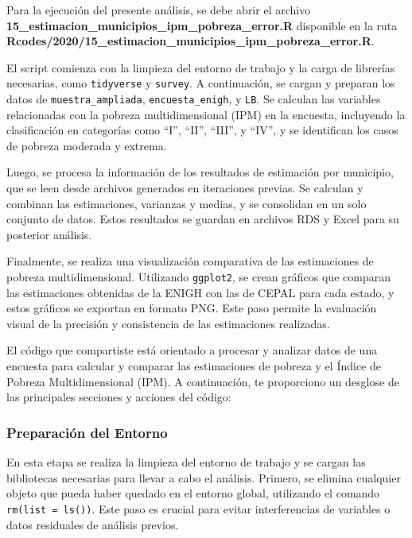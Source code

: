 \documentclass[
  12pt,
]{book}
\begin{document}
Para la ejecución del presente análisis, se debe abrir el archivo \textbf{15\_estimacion\_municipios\_ipm\_pobreza\_error.R} disponible en la ruta \textbf{Rcodes/2020/15\_estimacion\_municipios\_ipm\_pobreza\_error.R}.

El script comienza con la limpieza del entorno de trabajo y la carga de librerías necesarias, como \texttt{tidyverse} y \texttt{survey}. A continuación, se cargan y preparan los datos de \texttt{muestra\_ampliada}, \texttt{encuesta\_enigh}, y \texttt{LB}. Se calculan las variables relacionadas con la pobreza multidimensional (IPM) en la encuesta, incluyendo la clasificación en categorías como ``I'', ``II'', ``III'', y ``IV'', y se identifican los casos de pobreza moderada y extrema.

Luego, se procesa la información de los resultados de estimación por municipio, que se leen desde archivos generados en iteraciones previas. Se calculan y combinan las estimaciones, varianzas y medias, y se consolidan en un solo conjunto de datos. Estos resultados se guardan en archivos RDS y Excel para su posterior análisis.

Finalmente, se realiza una visualización comparativa de las estimaciones de pobreza multidimensional. Utilizando \texttt{ggplot2}, se crean gráficos que comparan las estimaciones obtenidas de la ENIGH con las de CEPAL para cada estado, y estos gráficos se exportan en formato PNG. Este paso permite la evaluación visual de la precisión y consistencia de las estimaciones realizadas.

El código que compartiste está orientado a procesar y analizar datos de una encuesta para calcular y comparar las estimaciones de pobreza y el Índice de Pobreza Multidimensional (IPM). A continuación, te proporciono un desglose de las principales secciones y acciones del código:

\hypertarget{preparaciuxf3n-del-entorno}{%
\subsubsection*{Preparación del Entorno}\label{preparaciuxf3n-del-entorno}}

En esta etapa se realiza la limpieza del entorno de trabajo y se cargan las bibliotecas necesarias para llevar a cabo el análisis. Primero, se elimina cualquier objeto que pueda haber quedado en el entorno global, utilizando el comando \texttt{rm(list\ =\ ls())}. Este paso es crucial para evitar interferencias de variables o datos residuales de análisis previos.
\end{document}

